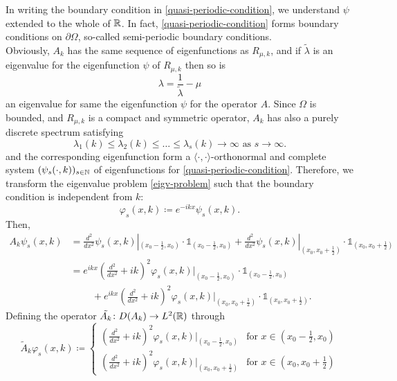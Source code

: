 In writing the boundary condition in \eqref{quasi-periodic-condition}, we understand $\psi$ extended to the whole of $\mathbb{R}$. In fact, \eqref{quasi-periodic-condition} forms boundary conditions on $\partial \Omega$, so-called semi-periodic boundary conditions.
~\\
Obviously, $A_{k}$ has the same sequence of eigenfunctions as $R_{\mu, k}$, and if $\tilde{\lambda}$ is an eigenvalue for the eigenfunction $\psi$ of $R_{\mu, k}$ then so is
	\[ \lambda = \frac{1}{\tilde{\lambda}} - \mu \]
 an eigenvalue for same the eigenfunction $\psi$ for the operator $A$. Since $\Omega$ is bounded, and $R_{\mu, k}$ is a compact and symmetric operator, $A_{k}$ has also a purely discrete spectrum satisfying	
	\[ \lambda_{1}(k) \leq \lambda_{2}(k) \leq \dotsc \leq \lambda_{s}(k) \rightarrow \infty \text{ as } s \rightarrow \infty. \]
and the corresponding eigenfunction form a $\langle \cdot , \cdot \rangle$-orthonormal and complete system $(\psi_{s}(\cdot, k))_{s \in \mathbb{N}}$ of eigenfunctions for \eqref{quasi-periodic-condition}. Therefore, we transform the eigenvalue problem \eqref{eigv-problem} such that the boundary condition is independent from $k$:
	\[ \varphi_{s}(x, k) \coloneqq e^{-ikx} \psi_{s}(x, k). \]
Then,
	\begin{align*}
		A_{k} \psi_{s}(x, k) & = \frac{d^{2}}{dx^{2}} \psi_{s}(x, k)|_{(x_{0} - \frac{1}{2}, x_{0})} \cdot \mathds{1}_{(x_{0} - \frac{1}{2}, x_{0})} + \frac{d^{2}}{dx^{2}} \psi_{s}(x, k)|_{(x_{0}, x_{0}  + \frac{1}{2})} \cdot \mathds{1}_{(x_{0}, x_{0} + \frac{1}{2})} \\
				& = e^{ikx} \left( \frac{d^{2}}{dx^{2}} + ik \right)^{2} \varphi_{s}(x, k)|_{(x_{0} - \frac{1}{2}, x_{0})} \cdot \mathds{1}_{(x_{0} - \frac{1}{2}, x_{0})} \\
				& ~\qquad + e^{ikx} \left( \frac{d^{2}}{dx^{2}} + ik \right)^{2} \varphi_{s}(x, k)|_{(x_{0}, x_{0}  + \frac{1}{2})} \cdot \mathds{1}_{(x_{0}, x_{0} + \frac{1}{2})}.
	\end{align*}
Defining the operator $\tilde{A_{k}} \colon D(A_{k}) \rightarrow L^{2}(\mathbb{R})$ through 
	\[ \tilde{A}_{k} \varphi_{s}(x, k) \coloneqq \begin{cases}
 		\left( \frac{d^{2}}{dx^{2}} + ik \right)^{2} \varphi_{s}(x, k)|_{(x_{0} - \frac{1}{2}, x_{0})} & \text{for } x \in (x_{0} - \frac{1}{2}, x_{0}) \\ \left( \frac{d^{2}}{dx^{2}} + ik \right)^{2} \varphi_{s}(x, k)|_{(x_{0}, x_{0}  + \frac{1}{2})} & \text{for } x \in (x_{0}, x_{0} + \frac{1}{2})
 	\end{cases} \] 
